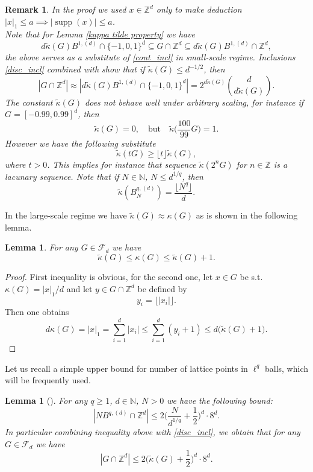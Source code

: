\documentclass[10pt,a4paper]{amsart}
\numberwithin{equation}{section}
\newtheorem{Lem}[Thm]{Lemma}
\newtheorem{Rem}[Thm]{Remark}
\newcommand{\Z}{\mathbb{Z}}
\newcommand{\N}{\mathbb{N}}
\DeclareMathOperator{\supp}{supp}
\begin{document}
\begin{Rem}
    In the proof we used $x \in \Z^d$ only to make deduction $|x|_1 \le a \implies |\supp(x)| \le a$. \\
    Note that for Lemma \ref{kappa tilde property} we have 
    \begin{equation} \label{disc_incl}
        d \widetilde{\kappa}(G) B^{1,(d)} \cap \{-1,0,1 \}^d \subseteq G \cap \Z^d \subseteq d \widetilde{\kappa}(G) B^{1,(d)} \cap \Z^d,
    \end{equation}
    the above serves as a substitute of \eqref{cont_incl} in small-scale regime. Inclusions \eqref{disc_incl} combined with \cite[Corollary 1.8]{KNW} show that if $\widetilde{\kappa}(G) \le d^{-1/2}$, then 
    \[
    |G \cap \Z^d| \approx |d \widetilde{\kappa}(G) B^{1,(d)} \cap \{-1,0,1 \}^d|= 2^{d \widetilde{\kappa}(G)} \binom{d}{d \widetilde{\kappa}(G)}.
    \]
    The constant $\widetilde{\kappa}(G)$ does not behave well under arbitrary scaling, for instance if $G=[-0.99,0.99]^d$, then
    \[
    \widetilde{\kappa}(G)=0, \quad \text{but} \quad \widetilde{\kappa}\Big(\frac{100}{99}G \Big)=1.
    \]
    However we have the following substitute 
    \[
    \widetilde{\kappa}(tG) \ge \lfloor t \rfloor \widetilde{\kappa}(G),
    \]
    where $t>0$. This implies for instance that sequence $\widetilde{\kappa}(2^nG)$ for $n \in \Z$ is a lacunary sequence. Note that if $N \in \N$, $N\le d^{1/q}$, then
    \[
    \widetilde{\kappa}(B_N^{q,(d)})= \frac{\lfloor N^q \rfloor}{d}.
    \]
\end{Rem}
    In the large-scale regime we have $\widetilde{\kappa}(G) \approx\kappa(G)$ as is shown in the following lemma. 
\begin{Lem} \label{tilde kappa comparable to kappa in large scale}
 For any $G \in \mathcal{F}_d$ we have
 \[
 \widetilde{\kappa}(G) \le \kappa(G) \le \widetilde{\kappa}(G)+1.
 \]
\end{Lem}
\begin{proof}
First inequality is obvious, for the second one, let $x \in G$ be s.t. $\kappa(G)=|x|_1/d$ and let $y \in G \cap \Z^d$ be defined by 
\[
y_i= \lfloor |x_i| \rfloor.
\]
Then one obtains
\[
d\kappa(G)=|x|_1 = \sum_{i=1}^d |x_i| \le  \sum_{i=1}^d (y_i+1) \le d \big( \widetilde{\kappa}(G)+1 \big).
\]
\end{proof}
Let us recall a simple upper bound for number of lattice points in $\ell^q$ balls, which will be frequently used.
\begin{Lem}[{\cite[Corollary 2.2]{Ni2}}] \label{Cor 2.2 from my lq paper}
    For any $q \ge 1$, $d \in \N$, $N>0$ we have the following bound:
    \[
    |NB^{q,(d)} \cap \Z^d| \le 2 \Big( \frac{N}{d^{1/q}}+ \frac{1}{2} \Big)^d \cdot 8^d.
    \]
    In particular combining inequality above with \eqref{disc_incl}, we obtain that for any $G \in \mathcal{F}_d$ we have
    \[
    |G \cap \Z^d| \le 2 \Big( \widetilde{\kappa}(G)+ \frac{1}{2} \Big)^d \cdot 8^d.
    \]
\end{Lem}
\end{document}
